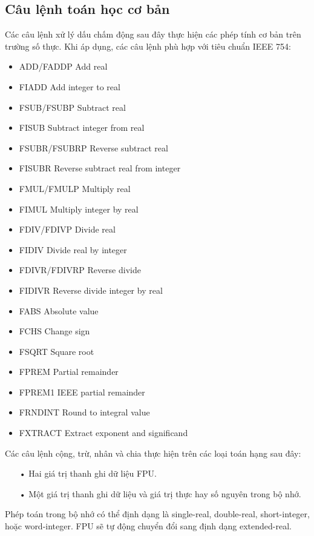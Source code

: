 		\subsection*{Câu lệnh toán học cơ bản}
		Các câu lệnh xử lý dấu chấm động sau đây thực hiện các phép tính cơ bản trên trường số thực. Khi áp dụng, các câu lệnh phù hợp với tiêu chuẩn IEEE 754:
		\begin{itemize}
			\renewcommand{\labelitemi}{}
			\item	 ADD/FADDP Add real
			\item	FIADD Add integer to real
			\item	FSUB/FSUBP Subtract real
			\item	FISUB Subtract integer from real
			\item	FSUBR/FSUBRP Reverse subtract real
			\item	FISUBR Reverse subtract real from integer
			\item	FMUL/FMULP Multiply real
			\item	FIMUL Multiply integer by real
			\item	FDIV/FDIVP Divide real
			\item	FIDIV Divide real by integer
			\item	FDIVR/FDIVRP Reverse divide
			\item	FIDIVR Reverse divide integer by real
			\item	FABS Absolute value
			\item	FCHS Change sign
			\item	FSQRT Square root
			\item	FPREM Partial remainder
			\item	FPREM1 IEEE partial remainder
			\item	FRNDINT Round to integral value
			\item	FXTRACT Extract exponent and significand
		\end{itemize}
		
		\newpage
	Các câu lệnh cộng, trừ, nhân và chia thực hiện trên các loại toán hạng sau đây:
		\begin{itemize}
			\item[•]	Hai giá trị thanh ghi dữ liệu FPU.
			\item[•]   Một giá trị thanh ghi dữ liệu và giá trị thực hay số nguyên trong bộ nhớ.
		\end{itemize}
 
		Phép toán trong bộ nhớ có thể định dạng là single-real, double-real, short-integer, hoặc word-integer. FPU sẽ tự động chuyển đổi sang định dạng extended-real. \\
		
